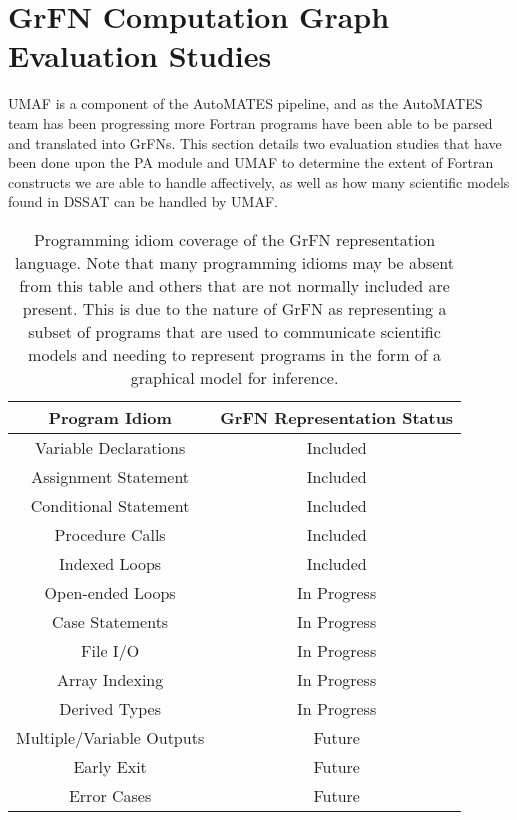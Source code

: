 \section{GrFN Computation Graph Evaluation Studies\label{sec:grfn_eval}}
UMAF is a component of the AutoMATES pipeline, and as the AutoMATES team has been progressing more Fortran programs have been able to be parsed and translated into GrFNs.
This section details two evaluation studies that have been done upon the PA module and UMAF to determine the extent of Fortran constructs we are able to handle affectively, as well as how many scientific models found in DSSAT can be handled by UMAF.

\begin{table}
  \centering
  \label{tab:prog_idioms}
  \begin{tabular}{ |c|c| }
   \hline
   \textbf{Program Idiom} & \textbf{GrFN Representation Status} \\
   \hline
   Variable Declarations & Included \\
   Assignment Statement & Included \\
   Conditional Statement & Included \\
   Procedure Calls & Included \\
   Indexed Loops & Included \\
   Open-ended Loops & In Progress \\
   Case Statements & In Progress \\
   File I/O & In Progress \\
   Array Indexing & In Progress \\
   Derived Types & In Progress \\
   Multiple/Variable Outputs & Future \\
   Early Exit & Future \\
   Error Cases & Future \\
   \hline
  \end{tabular}
  \caption[GrFN Program Idiom Coverage]{Programming idiom coverage of the GrFN representation language. Note that many programming idioms may be absent from this table and others that are not normally included are present. This is due to the nature of GrFN as representing a subset of programs that are used to communicate scientific models and needing to represent programs in the form of a graphical model for inference.}
\end{table}

